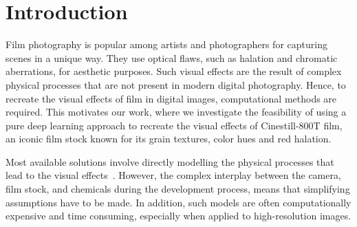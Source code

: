 \section{Introduction}
\label{sec:introduction}


Film photography is popular among artists and photographers for capturing scenes
in a unique way. They use optical flaws, such as halation and chromatic
aberrations, for aesthetic purposes. Such visual effects are the result of
complex physical processes that are not present in modern digital photography.
Hence, to recreate the visual effects of film in digital images, computational
methods are required. This motivates our work, where we investigate the
feasibility of using a pure deep learning approach to recreate the visual
effects of Cinestill-800T film, an iconic film stock known for its grain
textures, color hues and red halation.


Most available solutions involve directly modelling
the physical processes that lead to the visual effects~\cite{film-grain-rendering}. However, the complex
interplay between the camera, film stock, and chemicals during the development
process, means that simplifying assumptions have to be made. In addition, such
models are often computationally expensive and time consuming, especially when applied to
high-resolution images.

